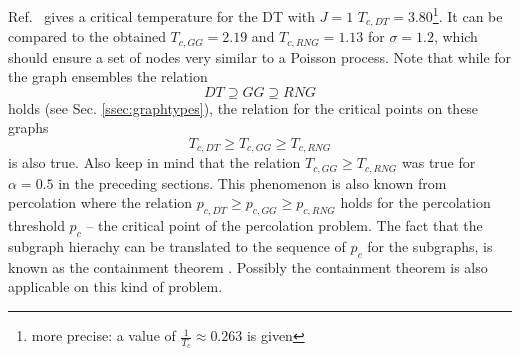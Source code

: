         Ref.\ \cite{Janke1994} gives a critical temperature for the DT with \(J=1\)
        \(T_{c,DT} = 3.80\)\footnote{more precise: a value of \(\frac{1}{T_c} \approx 0.263\) is given}.
        It can be compared to the obtained \(T_{c,GG} = 2.19\)
        and \(T_{c,RNG} = 1.13\) for \(\sigma = 1.2\), which should
        ensure a set of nodes very similar to a Poisson process.
        Note that while for the graph ensembles the relation
        \begin{equation}
            DT \supseteq GG \supseteq RNG
        \end{equation}
        holds (see Sec. \ref{ssec:graphtypes}), the relation for the
        critical points on these graphs
        \begin{equation}
            T_{c,DT} \ge T_{c,GG} \ge T_{c,RNG}
        \end{equation}
        is also true.
        Also keep in mind that the relation \(T_{c,GG} \ge T_{c,RNG}\)
        was true for \(\alpha = 0.5\) in the preceding sections.
        This phenomenon is also known from percolation where the relation
        \(p_{c,DT} \ge p_{c,GG} \ge p_{c,RNG}\) holds for the percolation
        threshold \(p_c\) -- the critical point of the percolation problem.
        The fact that the subgraph hierachy can be translated to
        the sequence of \(p_c\) for the subgraphs, is known as the containment
        theorem \cite{fisher}.
        Possibly the containment theorem is also applicable on this kind of
        problem.

